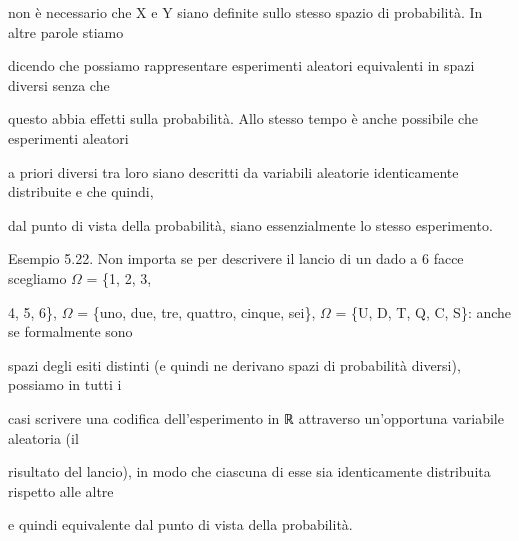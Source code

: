 \documentclass[a4paper,portrait,12pt]{article}
\begin{document}
\begin{flushleft}
non \`{e} necessario che X e Y siano definite sullo stesso spazio di probabilit\`{a}. In altre parole stiamo
\end{flushleft}


\begin{flushleft}
dicendo che possiamo rappresentare esperimenti aleatori equivalenti in spazi diversi senza che
\end{flushleft}


\begin{flushleft}
questo abbia effetti sulla probabilit\`{a}. Allo stesso tempo \`{e} anche possibile che esperimenti aleatori
\end{flushleft}


\begin{flushleft}
a priori diversi tra loro siano descritti da variabili aleatorie identicamente distribuite e che quindi,
\end{flushleft}


\begin{flushleft}
dal punto di vista della probabilit\`{a}, siano essenzialmente lo stesso esperimento.
\end{flushleft}


\begin{flushleft}
Esempio 5.22. Non importa se per descrivere il lancio di un dado a 6 facce scegliamo $\Omega$ = \{1, 2, 3,
\end{flushleft}


\begin{flushleft}
4, 5, 6\}, $\Omega$ = \{uno, due, tre, quattro, cinque, sei\}, $\Omega$ = \{U, D, T, Q, C, S\}: anche se formalmente sono
\end{flushleft}


\begin{flushleft}
spazi degli esiti distinti (e quindi ne derivano spazi di probabilit\`{a} diversi), possiamo in tutti i
\end{flushleft}


\begin{flushleft}
casi scrivere una codifica dell'esperimento in ℝ attraverso un'opportuna variabile aleatoria (il
\end{flushleft}


\begin{flushleft}
risultato del lancio), in modo che ciascuna di esse sia identicamente distribuita rispetto alle altre
\end{flushleft}


\begin{flushleft}
e quindi equivalente dal punto di vista della probabilit\`{a}.
\end{flushleft}
\end{document}
